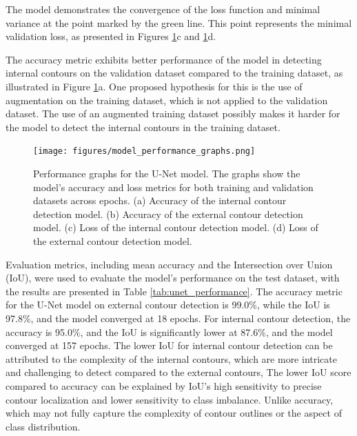 \documentclass[preprint,12pt]{elsarticle}
\begin{document}
The model demonstrates the convergence of the loss function and minimal variance at the point marked by the green line.
This point represents the minimal validation loss, as presented in Figures \ref{fig:model_performance_graphs}c and \ref{fig:model_performance_graphs}d.

The accuracy metric exhibits better performance of the model in detecting internal contours on the validation dataset compared to the training dataset, as illustrated in Figure \ref{fig:model_performance_graphs}a.
One proposed hypothesis for this is the use of augmentation on the training dataset, which is not applied to the validation dataset.
The use of an augmented training dataset possibly makes it harder for the model to detect the internal contours in the training dataset.

\begin{figure}[ht!]
    \centering
    \begin{adjustbox}{max width=\linewidth, max height=\textheight}
        \texttt{[image: figures/model\_performance\_graphs.png]}
    \end{adjustbox}
    \caption{Performance graphs for the U-Net model. The graphs show the model's accuracy and loss metrics for both training and validation datasets across epochs. (a) Accuracy of the internal contour detection model. (b) Accuracy of the external contour detection model. (c) Loss of the internal contour detection model. (d) Loss of the external contour detection model.}
    \label{fig:model_performance_graphs}
\end{figure}

Evaluation metrics, including mean accuracy and the Intersection over Union (IoU), were used to evaluate the model's performance on the test dataset, with the results are presented in Table \ref{tab:unet_performance}.
The accuracy metric for the U-Net model on external contour detection is 99.0\%, while the IoU is 97.8\%, and the model converged at 18 epochs.
For internal contour detection, the accuracy is 95.0\%, and the IoU is significantly lower at 87.6\%,  and the model converged at 157 epochs.
The lower IoU for internal contour detection can be attributed to the complexity of the internal contours, which are more intricate and challenging to detect compared to the external contours,
The lower IoU score compared to accuracy can be explained by IoU's high sensitivity to precise contour localization and lower sensitivity to class imbalance.
Unlike accuracy, which may not fully capture the complexity of contour outlines or the aspect of class distribution.
\end{document}
